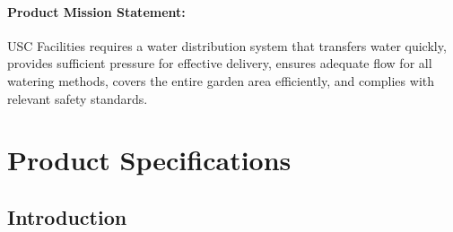 \documentclass[12pt]{report}
\begin{document}
\subsubsection{Product Mission Statement:}
USC Facilities requires a water distribution system that transfers water quickly, provides sufficient pressure for effective delivery, ensures adequate flow for all watering methods, covers the entire garden area efficiently, and complies with relevant safety standards.





\chapter{Product Specifications}

\section{Introduction}
\end{document}
